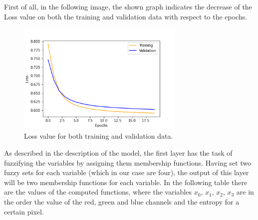 \documentclass[10pt,twocolumn,letterpaper]{article}
\begin{document}
First of all, in the following image, the shown graph indicates the decrease of the Loss value on both the training and validation data with respect to the epochs.
\begin{figure}[h]
\includegraphics[width=8cm]{images/Fold_0_Val_loss.png}
\caption{Loss value for both training and validation data.}
\end{figure}

As described in the description of the model, the first layer has the task of fuzzifying the variables by assigning them membership functions. Having set two fuzzy sets for each variable (which in our case are four), the output of this layer will be two membership functions for each variable. In the following table there are the values of the computed functions, where the variables $x_0$, $x_1$, $x_2$, $x_3$ are in the order the value of the red, green and blue channels and the entropy for a certain pixel.
\end{document}
